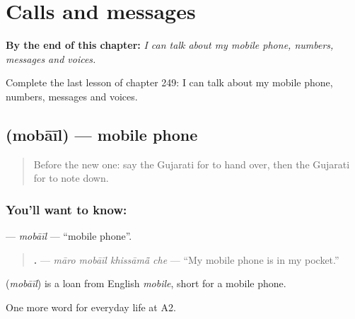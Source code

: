 
\chapter{Calls and messages}
\label{ch:gu-calls-and-messages}

\begin{chapteropening}
\textbf{By the end of this chapter:} \emph{I can talk about my mobile phone, numbers, messages and voices.}

Complete the last lesson of chapter 249: I can talk about my mobile phone, numbers, messages and voices.
\end{chapteropening}

\section[\texorpdfstring{\gu{મોબાઈલ} (mobāīl)}{મોબાઈલ (mobāīl)}]{ (mobāīl) — mobile phone}

\label{lesson:GU-C249-mobail}



\begin{quote}
Before the new one: say the Gujarati for to hand over, then the Gujarati for to note down.
\end{quote}

\subsection*{You'll want to know: }
\textbf{} — \emph{mobāīl} — \textquotedblleft{}mobile phone\textquotedblright{}.

\begin{quote}
\textbf{   .} — \emph{māro mobāīl khissāmā̃ che} — \textquotedblleft{}My mobile phone is in my pocket.\textquotedblright{}
\end{quote}

\begin{cousinweb}
\textbf{} (\emph{mobāīl}) is a loan from English \emph{mobile}, short for a mobile phone.
\end{cousinweb}

\begin{grammarlens}[title={What you've built}]
One more word for everyday life at A2.
\end{grammarlens}

